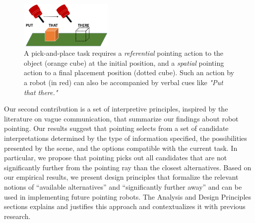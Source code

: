 \begin{figure}[t]
    \centering
    \includegraphics[width=0.4\textwidth, trim={0 0.3in 0 0in},clip]{figures/putthatthere2.png}
    \caption{A pick-and-place task requires a \textit{referential} pointing action to the object (orange cube) at the initial position, and a \textit{spatial} pointing action to a final placement position (dotted cube). Such an action by a robot (in red) can also be accompanied by verbal cues like \textit{"Put that there."}}
    \label{fig:pap}
\end{figure}

Our second contribution is a set of interpretive principles, inspired by the literature on vague communication, that summarize our findings about robot pointing.  Our results suggest that pointing selects from a set of candidate interpretations determined by the type of information specified, the possibilities presented by the scene, and the options compatible with the current task.  In particular, we propose that pointing picks out all candidates that are not significantly further from the pointing ray than the closest alternatives.  Based on our empirical results, we present design principles that formalize the relevant notions of ``available alternatives'' and ``significantly further away'' and can be used in implementing future pointing robots.  The Analysis and Design Principles sections explains and justifies this approach and contextualizes it with previous research.





